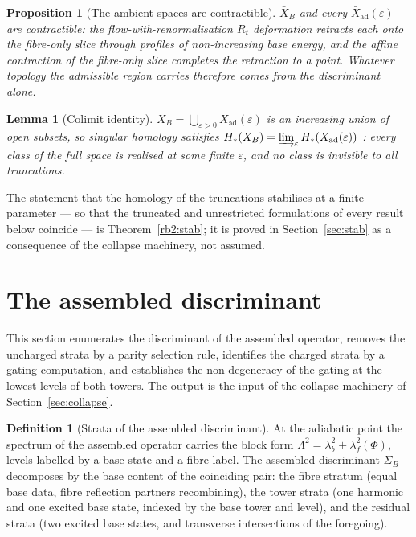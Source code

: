 \documentclass[11pt]{article}
\numberwithin{equation}{section}
\theoremstyle{plain}
\newtheorem{proposition}[theorem]{Proposition}
\newtheorem{lemma}[theorem]{Lemma}
\theoremstyle{definition}
\newtheorem{definition}[theorem]{Definition}
\theoremstyle{remark}
\newcommand{\Xad}{X_{\mathrm{ad}}}
\newcommand{\Xbad}{\bar{X}_{\mathrm{ad}}}
\begin{document}
\begin{proposition}[The ambient spaces are
contractible]\label{rb:ambient}
$\bar{X}_{B}$ and every $\Xbad(\varepsilon)$ are contractible: the
flow-with-renormalisation $R_{t}$ deformation retracts each onto
the fibre-only slice through profiles of non-increasing base
energy, and the affine contraction of the fibre-only slice
completes the retraction to a point. Whatever topology the
admissible region carries therefore comes from the discriminant
alone.
\end{proposition}

\begin{lemma}[Colimit identity]\label{rb:colimit}
$X_{B} = \bigcup_{\varepsilon > 0} \Xad(\varepsilon)$ is an
increasing union of open subsets, so singular homology satisfies
$H_{*}(X_{B}) = \varinjlim_{\varepsilon}
H_{*}(\Xad(\varepsilon))$ \cite{Hatcher2002}: every class of the
full space is realised at some finite $\varepsilon$, and no class
is invisible to all truncations.
\end{lemma}

The statement that the homology of the truncations stabilises at a
finite parameter --- so that the truncated and unrestricted
formulations of every result below coincide --- is
Theorem~\ref{rb2:stab}; it is proved in Section~\ref{sec:stab} as a
consequence of the collapse machinery, not assumed.

\section{The assembled discriminant}\label{sec:discriminant}

This section enumerates the discriminant of the assembled operator,
removes the uncharged strata by a parity selection rule, identifies
the charged strata by a gating computation, and establishes the
non-degeneracy of the gating at the lowest levels of both towers.
The output is the input of the collapse machinery of
Section~\ref{sec:collapse}.

\begin{definition}[Strata of the assembled
discriminant]\label{rb1:strata}
At the adiabatic point the spectrum of the assembled operator
carries the block form
$\Lambda^{2} = \lambda_{b}^{2} + \lambda_{f}^{2}(\Phi)$, levels
labelled by a base state and a fibre label. The assembled
discriminant $\Sigma_{B}$ decomposes by the base content of the
coinciding pair: the fibre stratum (equal base data, fibre
reflection partners recombining), the tower strata (one harmonic
and one excited base state, indexed by the base tower and level),
and the residual strata (two excited base states, and transverse
intersections of the foregoing).
\end{definition}
\end{document}
